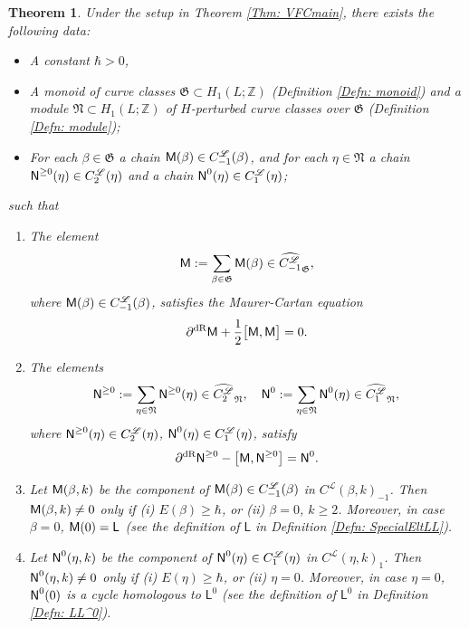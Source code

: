 \documentclass[10pt]{amsart}
\numberwithin{equation}{section}
\theoremstyle{plain}
\newtheorem{theorem}{Theorem}[section]
\theoremstyle{definition}
\theoremstyle{remark}
\numberwithin{equation}{section}
\newcommand{\Z}{\mathbb{Z}}
\newcommand{\wh}[1]{\widehat{#1}}
\newcommand{\dR}{\textup{dR}}
\newcommand{\Cfr}[1]{C_{#1}^\mathscr{L}}
\newcommand{\MM}{\textup{\textsf{M}}}
\newcommand{\NN}{\textup{\textsf{N}}}
\newcommand{\LL}{\textsf{L}}
\begin{document}
{\begin{theorem}\label{Thm: VFC}
Under the setup in Theorem \ref{Thm: VFCmain}, 
there exists the following data:
\begin{itemize}
	\item  A constant $\hbar>0$,
	\item A monoid of curve classes $\mathfrak{G}\subset H_1(L;\Z)$ (Definition \ref{Defn: monoid})  and a module $\mathfrak{N}\subset H_1(L;\Z)$ of $H$-perturbed curve classes over $\mathfrak{G}$ (Definition \ref{Defn: module});
	\item For each $\beta\in\mathfrak{G}$ a chain $\MM(\beta)\in \Cfr{-1}(\beta)$, and for each $\eta\in \mathfrak{N}$ a chain $\NN^{\geq 0}(\eta)\in \Cfr{2}(\eta)$ and a chain $\NN^0(\eta)\in \Cfr{1}(\eta)$;
\end{itemize}
such that 
\begin{enumerate}
	\item The element \[\MM := \sum_{\beta\in\mathfrak{G}} \MM(\beta) \in \wh{\Cfr{-1}}_\mathfrak{G}, \]where $\MM(\beta)\in \Cfr{-1}(\beta)$,
	satisfies the Maurer-Cartan equation  \[ \partial^\dR \MM + \frac{1}{2} \big[\MM,\MM\big]  = 0. \]
	\item The elements \[\NN^{\geq 0} := \sum_{\eta\in\mathfrak{N}} \NN^{\geq 0}(\eta) \in \wh{\Cfr{2}}_\mathfrak{N},\quad 
	\NN^{ 0} := \sum_{\eta\in\mathfrak{N}} \NN^{ 0}(\eta)\in \wh{\Cfr{1}}_\mathfrak{N}, \]where $\NN^{\geq 0}(\eta)\in \Cfr{2}(\eta)$, $\NN^0(\eta) \in \Cfr{1}(\eta)$,
	satisfy \[ \partial^\dR  \NN^{\geq 0}- \big[\MM, \NN^{\geq 0}\big] = \NN^{0}.   \]
	\item Let $\MM(\beta,k)$ be the component of $\MM(\beta)\in \Cfr{-1}(\beta)$ in $C^\mathscr{L}(\beta, k)_{-1}$. Then $\MM(\beta, k)\neq 0$ only if \emph{(i)} $E(\beta)\geq \hbar$, or \emph{(ii)} $\beta = 0$, $k\geq 2$. Moreover, in case $\beta = 0$, $\MM(0)=\LL$ (see the definition of $\LL$ in Definition \ref{Defn: SpecialEltLL}).
	\item Let $\NN^0(\eta,k)$ be the component of $\NN^0(\eta)\in \Cfr{1}(\eta)$ in $C^\mathscr{L}(\eta, k)_1$. Then $\NN^0(\eta, k)\neq 0$ only if \emph{(i)} $E(\eta)\geq \hbar$, or \emph{(ii)} $\eta = 0$. Moreover, in case $\eta = 0$, $\NN^0(0)$ is a cycle homologous to $\LL^0$ (see the definition of $\LL^0$ in Definition \ref{Defn: LL^0}).
\end{enumerate}
 \end{theorem}

}
\end{document}
